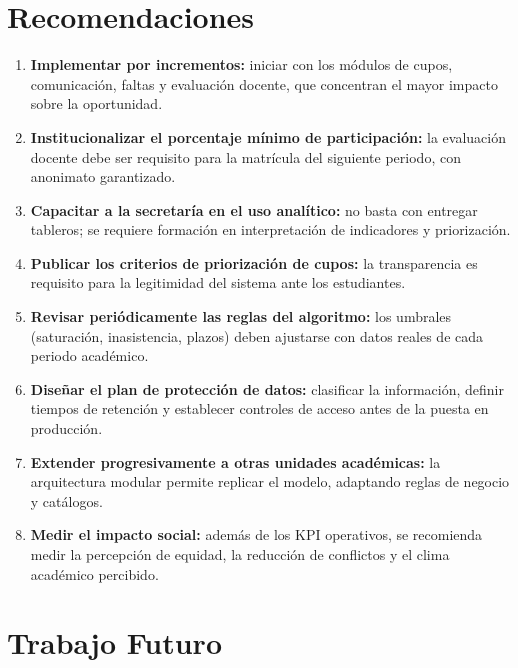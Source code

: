 \section{Recomendaciones}

\begin{enumerate}[leftmargin=1.4cm, itemsep=4pt]
  \item \textbf{Implementar por incrementos:} iniciar con los módulos de cupos,
        comunicación, faltas y evaluación docente, que concentran el mayor
        impacto sobre la oportunidad.

  \item \textbf{Institucionalizar el porcentaje mínimo de participación:} la
        evaluación docente debe ser requisito para la matrícula del siguiente
        periodo, con anonimato garantizado.

  \item \textbf{Capacitar a la secretaría en el uso analítico:} no basta con
        entregar tableros; se requiere formación en interpretación de
        indicadores y priorización.

  \item \textbf{Publicar los criterios de priorización de cupos:} la
        transparencia es requisito para la legitimidad del sistema ante los
        estudiantes.

  \item \textbf{Revisar periódicamente las reglas del algoritmo:} los umbrales
        (saturación, inasistencia, plazos) deben ajustarse con datos reales de
        cada periodo académico.

  \item \textbf{Diseñar el plan de protección de datos:} clasificar la
        información, definir tiempos de retención y establecer controles de
        acceso antes de la puesta en producción.

  \item \textbf{Extender progresivamente a otras unidades académicas:} la
        arquitectura modular permite replicar el modelo, adaptando reglas de
        negocio y catálogos.

  \item \textbf{Medir el impacto social:} además de los \ac{KPI} operativos, se
        recomienda medir la percepción de equidad, la reducción de conflictos y
        el clima académico percibido.
\end{enumerate}

\section{Trabajo Futuro}

